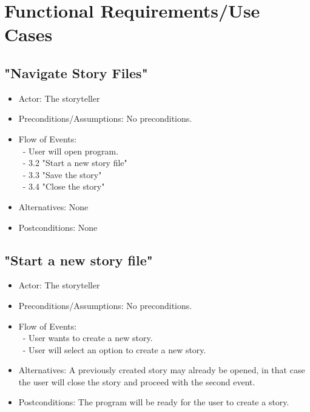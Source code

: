 \documentclass[12pt]{article}
\begin{document}
	
\section{Functional Requirements/Use Cases}
\subsection{"Navigate Story Files"}
\begin{itemize}
	\item Actor: The storyteller 
	\item Preconditions/Assumptions: No preconditions.
	\item Flow of Events: \\
	 	\ - User will open program. \\
		\ - 3.2 "Start a new story file" \\
		\ - 3.3 "Save the story" \\
		\ - 3.4 "Close the story"
	\item Alternatives: None
	\item Postconditions: None
\end{itemize}

	\subsection{"Start a new story file"}
\begin{itemize}
	\item Actor: The storyteller 
	\item Preconditions/Assumptions: No preconditions.
	\item Flow of Events: \\
		\ - User wants to create a new story. \\
		\ - User will select an option to create a new story.
	
	\item Alternatives: A previously created story may already be opened, in that case the user will close the story and proceed with the second event.
	\item Postconditions: The program will be ready for the user to create a story.
\end{itemize}
\end{document}
